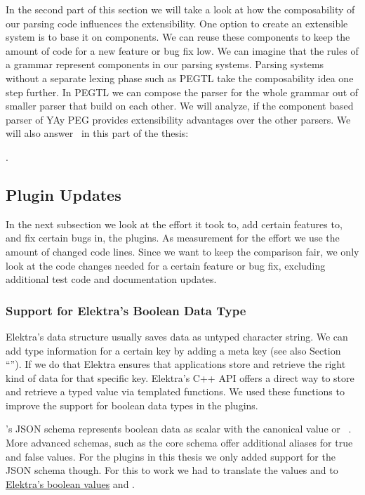 In the second part of this section we will take a look at how the composability of our parsing code influences the extensibility. One option to create an extensible system is to base it on components. We can reuse these components to keep the amount of code for a new feature or bug fix low. We can imagine that the rules of a grammar represent components in our parsing systems. Parsing systems without a separate lexing phase such as PEGTL take the composability idea one step further. In PEGTL we can compose the parser for the whole grammar out of smaller parser that build on each other. We will analyze, if the component based parser of YAy PEG provides extensibility advantages over the other parsers. We will also answer~ in this part of the thesis:

  \closeness*

.

\subsection{Plugin Updates}

In the next subsection we look at the effort it took to, add certain features to, and fix certain bugs in, the  plugins. As measurement for the effort we use the amount of changed code lines. Since we want to keep the comparison fair, we only look at the code changes needed for a certain feature or bug fix, excluding additional test code and documentation updates.

\subsubsection{Support for Elektra’s Boolean Data Type}

Elektra’s  data structure usually saves data as untyped character string. We can add type information for a certain key by adding a  meta key (see also Section “”). If we do that Elektra ensures that applications store and retrieve the right kind of data for that specific key. Elektra’s C++ API offers a direct way to store and retrieve a typed value via templated functions. We used these functions to improve the support for boolean data types in the  plugins.

’s JSON schema represents boolean data as scalar with the canonical value  or ~\cite{ben2009yaml}. More advanced schemas, such as the core schema offer additional aliases for true and false values. For the  plugins in this thesis we only added support for the JSON schema though. For this to work we had to translate the  values  and  to \href{https://master.libelektra.org/doc/decisions/bool.md}{Elektra’s boolean values}  and .

